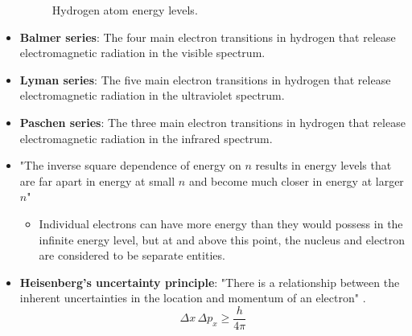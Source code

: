 \documentclass[../main.tex]{subfiles}
\begin{document}
\begin{itemize}
\begin{figure}[h!]
        \caption{Hydrogen atom energy levels.}
        \label{fig:energyLevelH}
    \end{figure}
    \item \textbf{Balmer series}: The four main electron transitions in hydrogen that release electromagnetic radiation in the visible spectrum.
    \item \textbf{Lyman series}: The five main electron transitions in hydrogen that release electromagnetic radiation in the ultraviolet spectrum.
    \item \textbf{Paschen series}: The three main electron transitions in hydrogen that release electromagnetic radiation in the infrared spectrum.
    \item "The inverse square dependence of energy on $n$ results in energy levels that are far apart in energy at small $n$ and become much closer in energy at larger $n$" \parencite[12]{bib:MiesslerFischerTarr}
    \begin{itemize}
        \item Individual electrons can have more energy than they would possess in the infinite energy level, but at and above this point, the nucleus and electron are considered to be separate entities.
    \end{itemize}
    \item \textbf{Heisenberg's uncertainty principle}: "There is a relationship between the inherent uncertainties in the location and momentum of an electron" \parencite[14]{bib:MiesslerFischerTarr}.
    \begin{equation*}
        \Delta x\, \Delta p_x \geq \frac{h}{4\pi}
    \end{equation*}

\end{itemize}
\end{document}
